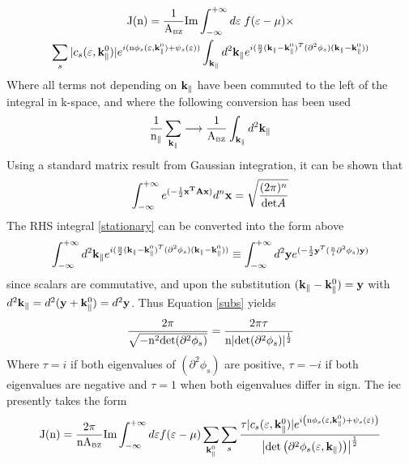 \documentclass[a4paper, 12pt]{article}
\begin{document}
\begin{multline}\label{stationary}
	{\rm J(n) = \frac{1}{\rm A_{\scriptscriptstyle BZ}}Im}\int_{-\infty}^{+\infty}d\varepsilon\;f(\varepsilon - \mu)\times \\ \sum_s{|c_s(\varepsilon,{\bf k}_\parallel^0)| e^{i{\rm (n} \phi_s(\varepsilon, {\bf k}_\parallel^0)+ \psi_s(\varepsilon))}}\int_{\bf k_\parallel}d^2 {\bf k}_\parallel \mathnormal e^{i(\frac{\rm n}{2}({\bf k}_\parallel - {\bf k}_\parallel^0)^T(\partial^2\phi_s) ({\bf k}_\parallel - {\bf k}_\parallel^0))}
\end{multline}
Where all terms not depending on $\bf k_\parallel$ have been commuted to the left of the integral in k-space, and where the following conversion has been used
\begin{equation}
	\frac{1}{\rm n_\parallel}\sum_{\bf k_\parallel} \longrightarrow \frac{1}{\rm A_{\scriptscriptstyle BZ}} \int_{\bf k_\parallel}d^2 \bf k_\parallel
\end{equation}	
Using a standard matrix result from Gaussian integration{}, it can be shown that
\begin{equation}
	\int_{-\infty}^{+\infty} e^{(-\frac{1}{2}{\bf x^TAx})}d^n{\bf x}=\sqrt{\frac{(2\pi)^n}{{\rm det}A}}
\end{equation}
The RHS integral \eqref{stationary} can be converted into the form above
\begin{equation}\label{subs}
	\int_{-\infty}^{+\infty}d^2 {\bf k}_\parallel \mathnormal e^{i(\frac{\rm n}{2}({\bf k}_\parallel - {\bf k}_\parallel^0)^T(\partial^2\phi_s) ({\bf k}_\parallel - {\bf k}_\parallel^0))} \equiv\int_{-\infty}^{+\infty}d^2 {\bf y} \mathnormal e^{(-\frac{\rm 1}{2}{\bf y}^T( \frac{\rm n}{i}\partial^2\phi_s) {\bf y})}
\end{equation}
since scalars are commutative, and upon the substitution $({\bf k}_\parallel - {\bf k}_\parallel^0)={\bf y}$ with $d^2{\bf k}_\parallel = d^2({\bf y} + {\bf k}_\parallel^0)=d^2{\bf y}$.
Thus Equation \eqref{subs} yields
\begin{equation}
	\frac{2\pi}{\sqrt{-{\rm n}^2{\rm det}(\partial^2\phi_s)}} = \frac{2\pi\tau}{{\rm n}|{\rm det}(\partial^2\phi_s)|^{\frac{1}{2}}}
\end{equation}
Where $\tau = i$ if both eigenvalues of $(\partial^2\phi_s)$ are positive, $\tau = -i$ if both eigenvalues are negative and $\tau = 1$ when both eigenvalues differ in sign.
The \gls{iec} presently takes the form
\begin{equation}
	{\rm J(n)} = \frac{2\pi}{\rm nA_{\scriptscriptstyle BZ}}{\rm Im}\int_{-\infty}^{+\infty}d\varepsilon f(\varepsilon - \mu)\sum_{{\bf k}_{\parallel}^0}\sum_s\frac{\tau {|c_s(\varepsilon, {\bf k}_\parallel^0)| e^{i\left({\rm n} \phi_s(\varepsilon, {\bf k}_\parallel^0)+ \psi_s(\varepsilon)\right)}}}{\left|{\rm det}\left(\partial^2\phi_s(\varepsilon, {\bf k}_\parallel)\right)\right|^{\frac{1}{2}}}
\end{equation}
\end{document}
